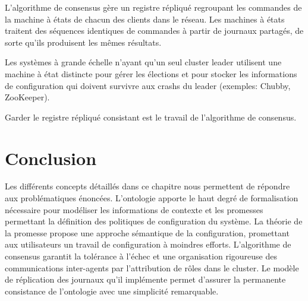 L'algorithme de consensus gère un registre répliqué regroupant les commandes de
la machine à états de chacun des clients dans le réseau. Les machines à états
traitent des séquences identiques de commandes à partir de journaux partagés, de
sorte qu'ils produisent les mêmes résultats.

Les systèmes à grande échelle n'ayant qu'un seul cluster leader utilisent une
machine à état distincte pour gérer les élections et pour stocker les
informations de configuration qui doivent survivre aux crashs du leader
(exemples: Chubby, ZooKeeper).

        Garder le registre répliqué consistant est le travail de l'algorithme de
        consensus.

\section{Conclusion}

Les différents concepts détaillés dans ce chapitre nous permettent de répondre
aux problématiques énoncées. L'ontologie apporte le haut degré de formalisation
nécessaire pour modéliser les informations de contexte et les promesses
permettant la définition des politiques de configuration du système.  La théorie
de la promesse propose une approche sémantique de la configuration, promettant
aux utilisateurs un travail de configuration à moindres efforts.  L'algorithme
de consensus garantit la tolérance à l'échec et une organisation rigoureuse des
communications inter-agents par l'attribution de rôles dans le cluster. Le
modèle de réplication des journaux qu'il implémente permet d'assurer la
permanente consistance de l'ontologie avec une simplicité remarquable.

